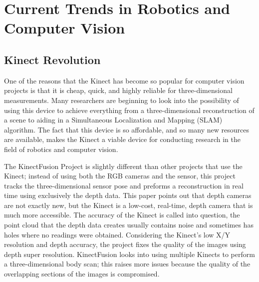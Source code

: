 \documentclass[pdftex,10.5pt]{report}
\begin{document}
\section{Current Trends in Robotics and Computer Vision}

\subsection{Kinect Revolution}
One of the reasons that the Kinect has become so popular for computer vision projects is that it is cheap, quick, and highly reliable for three-dimensional measurements. Many researchers are beginning to look into the possibility of using this device to achieve everything from a three-dimensional reconstruction of a scene to aiding in a Simultaneous Localization and Mapping (SLAM) algorithm. The fact that this device is so affordable, and so many new resources are available, makes the Kinect a viable device for conducting research in the field of robotics and computer vision.

The KinectFusion Project is slightly different than other projects that use the Kinect; instead of using both the RGB cameras and the sensor, this project tracks the three-dimensional sensor pose and preforms a reconstruction in real time using exclusively the depth data. This paper points out that depth cameras are not exactly new, but the Kinect is a low-cost, real-time, depth camera that is much more accessible. The accuracy of the Kinect is called into question, the point cloud that the depth data creates usually contains noise and sometimes has holes where no readings were obtained. Considering the Kinect's low X/Y resolution and depth accuracy, the project fixes the quality of the images using depth super resolution. KinectFusion looks into using multiple Kinects to perform a three-dimensional body scan; this raises more issues because the quality of the overlapping sections of the images is compromised.
\end{document}
